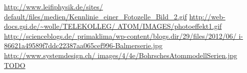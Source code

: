 \documentclass[pdftex, a4paper,11pt, twoside, ngerman]{report}
\begin{document}
  
  
  
  
  
  \begin{thebibliography}{99}
    \scriptsize
    \url{http://www.leifiphysik.de/sites/
        default/files/medien/Kennlinie_einer_Fotozelle_Bild_2.gif}
    \url{http://web-docs.gsi.de/~wolle/TELEKOLLEG/
        ATOM/IMAGES/photoeffekt1.gif}
    \url{http://scienceblogs.de/
        primaklima/wp-content/blogs.dir/29/files/2012/06/
        i-86621a49589f7ddc22387aa065cef996-Balmerserie.jpg}
    \url{http://www.systemdesign.ch/
        images/4/4e/BohrschesAtommodellSerien.jpg}
     \url{TODO}
   
  \end{thebibliography}
 
\end{document}
